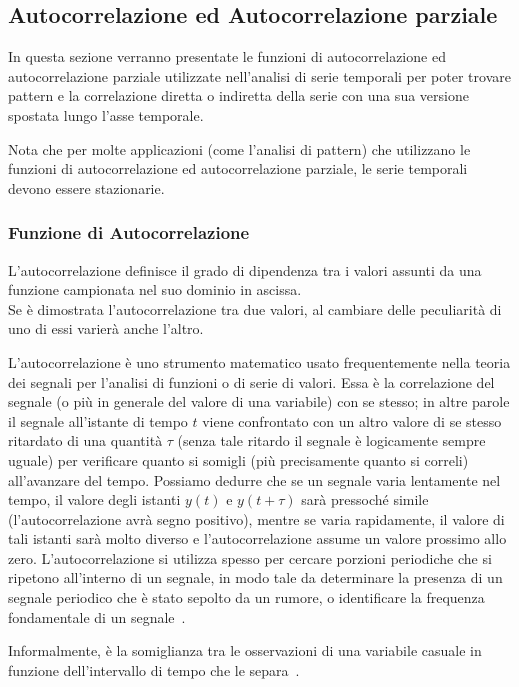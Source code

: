\subsection{Autocorrelazione ed Autocorrelazione parziale}
In questa sezione verranno presentate le funzioni di autocorrelazione ed autocorrelazione
parziale utilizzate nell'analisi di serie temporali per poter trovare pattern e la correlazione
diretta o indiretta della serie con una sua versione spostata lungo l'asse temporale.

Nota che per molte applicazioni (come l'analisi di pattern) che utilizzano le funzioni
di autocorrelazione ed autocorrelazione parziale, le serie temporali devono essere stazionarie.

\subsubsection{Funzione di Autocorrelazione}
L'autocorrelazione definisce il grado di dipendenza tra i valori assunti 
da una funzione campionata nel suo dominio in ascissa. \\
Se è dimostrata l'autocorrelazione tra due valori, al cambiare delle peculiarità 
di uno di essi varierà anche l'altro.

L'autocorrelazione è uno strumento matematico usato frequentemente nella teoria dei 
segnali per l'analisi di funzioni o di serie di valori. Essa è la correlazione 
del segnale (o più in generale del valore di una variabile) con se stesso; 
in altre parole il segnale all'istante di tempo $t$ viene confrontato con un altro valore 
di se stesso ritardato di una quantità 
$\tau$  (senza tale ritardo il segnale è logicamente sempre uguale) 
per verificare quanto si somigli (più precisamente quanto si correli) 
all'avanzare del tempo. Possiamo dedurre che se un segnale varia lentamente nel tempo, 
il valore degli istanti $y(t)$ e $y(t + \tau)$ sarà pressoché simile 
(l'autocorrelazione avrà segno positivo), mentre se varia rapidamente, 
il valore di tali istanti sarà molto diverso e l'autocorrelazione assume 
un valore prossimo allo zero. 
L'autocorrelazione si utilizza spesso per cercare porzioni periodiche che si ripetono 
all'interno di un segnale, in modo tale da determinare la presenza di un segnale 
periodico che è stato sepolto da un rumore, o identificare la frequenza fondamentale 
di un segnale~\cite{wiki:autcor_it}.

Informalmente, è la somiglianza tra le osservazioni di una variabile casuale 
in funzione dell'intervallo di tempo che le separa~\cite{wiki:autcor_en}.

